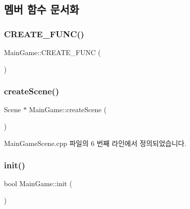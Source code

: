 \subsection{멤버 함수 문서화}
\mbox{\label{class_main_game_a1375b18a8348eb5a58aea4fd678fbad6}} 
\subsubsection{\texorpdfstring{C\+R\+E\+A\+T\+E\+\_\+\+F\+U\+N\+C()}{CREATE\_FUNC()}}
{\footnotesize\ttfamily Main\+Game\+::\+C\+R\+E\+A\+T\+E\+\_\+\+F\+U\+NC (\begin{DoxyParamCaption}\item[{\hyperlink{class_main_game}{Main\+Game}}]{ }\end{DoxyParamCaption})}

\mbox{\label{class_main_game_a4d902c709107b834b3cb1dcb8debc1aa}} 
\subsubsection{\texorpdfstring{create\+Scene()}{createScene()}}
{\footnotesize\ttfamily Scene $\ast$ Main\+Game\+::create\+Scene (\begin{DoxyParamCaption}{ }\end{DoxyParamCaption})\hspace{0.3cm}{\ttfamily [static]}}



Main\+Game\+Scene.\+cpp 파일의 6 번째 라인에서 정의되었습니다.

\mbox{\label{class_main_game_ab518edeb854c0447539b829790397dc6}} 
\subsubsection{\texorpdfstring{init()}{init()}}
{\footnotesize\ttfamily bool Main\+Game\+::init (\begin{DoxyParamCaption}{ }\end{DoxyParamCaption})\hspace{0.3cm}{\ttfamily [virtual]}}



